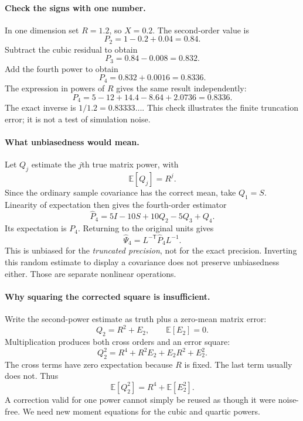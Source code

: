 \documentclass[11pt]{article}
\newcommand{\E}{\mathbb{E}}
\begin{document}
\paragraph{Check the signs with one number.}
In one dimension set $R=1.2$, so $X=0.2$. The second-order value is
\begin{equation}
 P_2=1-0.2+0.04=0.84.
\end{equation}
Subtract the cubic residual to obtain
\begin{equation}
 P_3=0.84-0.008=0.832.
\end{equation}
Add the fourth power to obtain
\begin{equation}
 P_4=0.832+0.0016=0.8336.
\end{equation}
The expression in powers of $R$ gives the same result independently:
\begin{equation}
 P_4=5-12+14.4-8.64+2.0736=0.8336.
\end{equation}
The exact inverse is $1/1.2=0.83333\ldots$. This check illustrates the
finite truncation error; it is not a test of simulation noise.

\paragraph{What unbiasedness would mean.}
Let $Q_j$ estimate the $j$th true matrix power, with
\begin{equation}
 \E[Q_j]=R^j.
\end{equation}
Since the ordinary sample covariance has the correct mean, take $Q_1=S$.
Linearity of expectation then gives the fourth-order estimator
\begin{equation}
 \widehat P_4=5I-10S+10Q_2-5Q_3+Q_4.
 \label{eq:fourth-estimator}
\end{equation}
Its expectation is $P_4$. Returning to the original units gives
\begin{equation}
 \widehat\Psi_4=L^{-\mathsf T}\widehat P_4 L^{-1}.
\end{equation}
This is unbiased for the \emph{truncated precision}, not for the exact
precision. Inverting this random estimate to display a covariance does not
preserve unbiasedness either. Those are separate nonlinear operations.

\paragraph{Why squaring the corrected square is insufficient.}
Write the second-power estimate as truth plus a zero-mean matrix error:
\begin{equation}
 Q_2=R^2+E_2,\qquad \E[E_2]=0.
\end{equation}
Multiplication produces both cross orders and an error square:
\begin{equation}
 Q_2^2=R^4+R^2E_2+E_2R^2+E_2^2.
\end{equation}
The cross terms have zero expectation because $R$ is fixed. The last term
usually does not. Thus
\begin{equation}
 \E[Q_2^2]=R^4+\E[E_2^2].
\end{equation}
A correction valid for one power cannot simply be reused as though it were
noise-free. We need new moment equations for the cubic and quartic powers.
\end{document}
